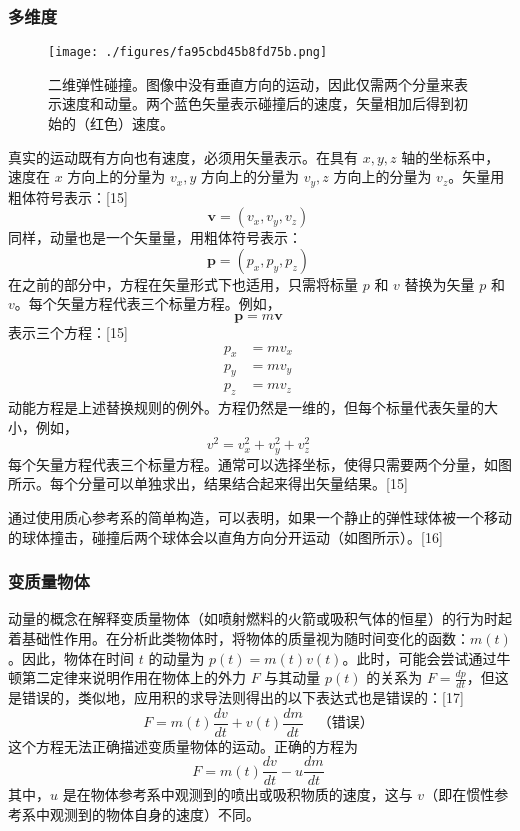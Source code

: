 \subsubsection{多维度}
\begin{figure}[ht]
\centering
\texttt{[image: ./figures/fa95cbd45b8fd75b.png]}
\caption{二维弹性碰撞。图像中没有垂直方向的运动，因此仅需两个分量来表示速度和动量。两个蓝色矢量表示碰撞后的速度，矢量相加后得到初始的（红色）速度。} \label{fig_DL_3}
\end{figure}
真实的运动既有方向也有速度，必须用矢量表示。在具有 \(x,y,z\) 轴的坐标系中，速度在 \(x\) 方向上的分量为 \(v_x,y\) 方向上的分量为 \(v_y,z\) 方向上的分量为 \(v_z\)。矢量用粗体符号表示：[15]
\[
\mathbf{v} = (v_x, v_y, v_z)~
\]
同样，动量也是一个矢量量，用粗体符号表示：
\[
\mathbf{p} = (p_x, p_y, p_z)~
\]
在之前的部分中，方程在矢量形式下也适用，只需将标量 \(p\) 和 \(v\) 替换为矢量 \(p\) 和 \(v\)。每个矢量方程代表三个标量方程。例如，
\[
\mathbf{p} = m\mathbf{v}~
\]
表示三个方程：[15]
\[
\begin{aligned}
p_x &= mv_x \\
p_y &= mv_y \\
p_z &= mv_z
\end{aligned}~
\]
动能方程是上述替换规则的例外。方程仍然是一维的，但每个标量代表矢量的大小，例如，
\[
v^2 = v_x^2 + v_y^2 + v_z^2~
\]
每个矢量方程代表三个标量方程。通常可以选择坐标，使得只需要两个分量，如图所示。每个分量可以单独求出，结果结合起来得出矢量结果。[15]

通过使用质心参考系的简单构造，可以表明，如果一个静止的弹性球体被一个移动的球体撞击，碰撞后两个球体会以直角方向分开运动（如图所示）。[16]
\subsubsection{变质量物体}
动量的概念在解释变质量物体（如喷射燃料的火箭或吸积气体的恒星）的行为时起着基础性作用。在分析此类物体时，将物体的质量视为随时间变化的函数：\( m(t) \)。因此，物体在时间 \( t \) 的动量为 \( p(t) = m(t)v(t) \)。此时，可能会尝试通过牛顿第二定律来说明作用在物体上的外力 \( F \) 与其动量 \( p(t) \) 的关系为 \( F = \frac{{dp}}{{dt}} \)，但这是错误的，类似地，应用积的求导法则得出的以下表达式也是错误的：[17]
\[
F = m(t) \frac{{d v}}{{d t}} + v(t) \frac{{d m}}{{d t}} \quad \text{（错误）}~
\]
这个方程无法正确描述变质量物体的运动。正确的方程为
\[
F = m(t) \frac{{d v}}{{d t}} - u \frac{{d m}}{{d t}}~
\]
其中，\( u \) 是在物体参考系中观测到的喷出或吸积物质的速度，这与 \( v \)（即在惯性参考系中观测到的物体自身的速度）不同。

